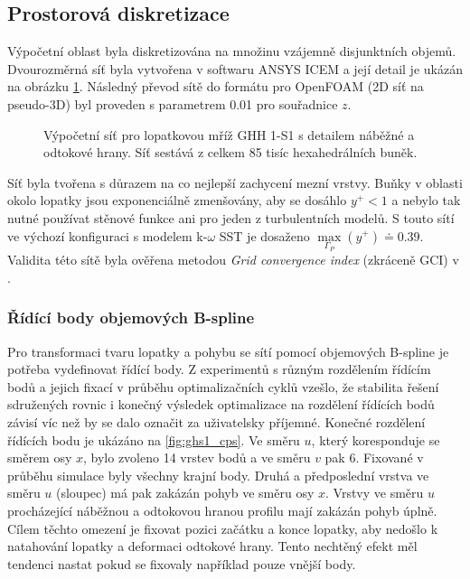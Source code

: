 \subsection{Prostorová diskretizace}

Výpočetní oblast byla diskretizována na množinu vzájemně disjunktních objemů. Dvourozměrná síť byla vytvořena v softwaru ANSYS ICEM a její detail je ukázán na obrázku \ref{fig:ghs1_sit}. Následný převod sítě do formátu pro OpenFOAM (2D síť na pseudo-3D) byl proveden s parametrem 0.01 pro souřadnice $ z $.

\begin{figure}
	\centering
	\def\svgwidth{1.0\textwidth}
	\graphicspath{{img/inkscape/}}
	
	\caption{Výpočetní síť pro lopatkovou mříž GHH 1-S1 s detailem náběžné a odtokové hrany. Síť sestává z celkem 85 tisíc hexahedrálních buněk. }
	\label{fig:ghs1_sit}
\end{figure}

Síť byla tvořena s důrazem na co nejlepší zachycení mezní vrstvy. Buňky v oblasti okolo lopatky jsou exponenciálně zmenšovány, aby se dosáhlo $ y^+ < 1 $ a nebylo tak nutné používat stěnové funkce ani pro jeden z turbulentních modelů.
S touto sítí ve výchozí konfiguraci s modelem k-$ \omega $ SST je dosaženo $ \max\limits_{\Gamma_P}(y^+) \doteq 0.39 $. Validita této sítě byla ověřena metodou \textit{Grid convergence index} (zkráceně GCI) v \cite{tater2021mesh}.


\subsubsection{Řídící body objemových B-spline}
Pro transformaci tvaru lopatky a pohybu se sítí pomocí objemových B-spline je potřeba vydefinovat řídící body. Z experimentů s různým rozdělením řídícím bodů a jejich fixací v průběhu optimalizačních cyklů vzešlo, že stabilita řešení sdružených rovnic i konečný výsledek optimalizace na rozdělení řídících bodů závisí víc než by se dalo označit za uživatelsky příjemné. Konečné rozdělení řídících bodu je ukázáno na \ref{fig:ghs1_cps}. Ve směru $ u $, který koresponduje se směrem osy $ x $, bylo zvoleno 14 vrstev bodů a ve směru $ v $ pak 6. Fixované v průběhu simulace byly všechny krajní body. Druhá a předposlední vrstva ve směru $ u $ (sloupec) má pak zakázán pohyb ve směru osy $ x $. Vrstvy ve směru $ u $ procházející náběžnou a odtokovou hranou profilu mají zakázán pohyb úplně. Cílem těchto omezení je fixovat pozici začátku a konce lopatky, aby nedošlo k natahování lopatky a deformaci odtokové hrany. Tento nechtěný efekt měl tendenci nastat pokud se fixovaly například pouze vnější body.

